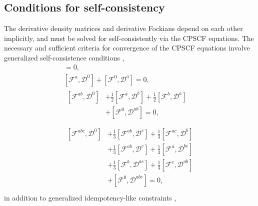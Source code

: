 \documentclass[prl,aps,preprint,showpacs,superbib]{revtex4}
\def\F{\mathcal{F}}
\def\D{\mathcal{D}}
\begin{document}
\subsection{Conditions for self-consistency}\label{SelfConsistency}

The derivative density matrices and derivative Fockians depend on 
each other implicitly, and must be solved for self-consistently
via the CPSCF equations.
The necessary and sufficient criteria for convergence of the 
CPSCF equations involve generalized self-consistence conditions \cite{Furche_2001},
\begin{gather}
    [\F^{0} ,\D^{0}]=0,\label{eq:commutators1}\\
    [\F^{a} ,\D^{0}]+[\F^{0},\D^{a}]=0,\label{eq:commutators2}\\
  \begin{split}
    [\F^{ab},\D^{0}]&+\frac{1}{2}[\F^{a},\D^{b}]+\frac{1}{2}[\F^{b},\D^{a}] \\
    &+[\F^{0},\D^{ab}]=0,\label{eq:commutators3}\\
  \end{split}\\
  \begin{split}
    [\F^{abc},\D^{0}]&+\frac{1}{3}[\F^{ab},\D^{c}]+\frac{1}{3}[\F^{ac},\D^{b}]\\
    &+\frac{1}{3}[\F^{ab},\D^{c}]+\frac{1}{3}[\F^{a},\D^{bc}]\\
    &+\frac{1}{3}[\F^{b},\D^{ac}]+\frac{1}{3}[\F^{c},\D^{ab}]\\
    &+[\F^{0},\D^{abc}]=0,\label{eq:commutators4}\\
  \end{split}
\end{gather}
in addition to generalized idempotency-like constraints \cite{Furche_2001},
\end{document}
